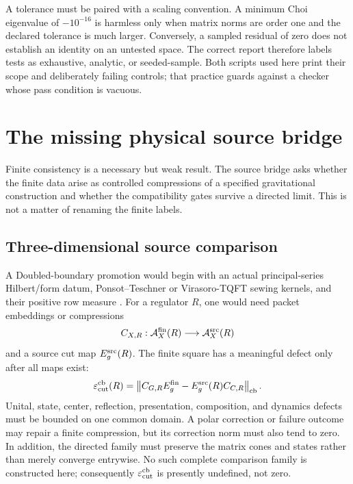 \documentclass[11pt,a4paper]{article}
\theoremstyle{definition}
\theoremstyle{remark}
\newcommand{\A}{\mathcal A}
\newcommand{\norm}[1]{\left\lVert #1\right\rVert}
\begin{document}
A tolerance must be paired with a scaling convention.  A minimum Choi eigenvalue of
$-10^{-16}$ is harmless only when matrix norms are order one and the declared tolerance
is much larger.  Conversely, a sampled residual of zero does not establish an identity
on an untested space.  The correct report therefore labels tests as exhaustive,
analytic, or seeded-sample.  Both scripts used here print their scope and deliberately
failing controls; that practice guards against a checker whose pass condition is
vacuous.

\section{The missing physical source bridge}
\label{sec:bridge}

Finite consistency is a necessary but weak result.  The source bridge asks whether the
finite data arise as controlled compressions of a specified gravitational construction
and whether the compatibility gates survive a directed limit.  This is not a matter of
renaming the finite labels.

\subsection{Three-dimensional source comparison}

A Doubled-boundary promotion would begin with an actual principal-series Hilbert/form datum,
Ponsot--Teschner or Virasoro-TQFT sewing kernels, and their positive row measure
\cite{PonsotTeschner1999,CollierEberhardtZhang2023}.  For a regulator $R$, one would need
packet embeddings or compressions
\begin{equation}
 C_{X,R}:\A_X^{\rm fin}(R)\longrightarrow\A_X^{\rm src}(R)
\end{equation}
and a source cut map $E_g^{\rm src}(R)$.  The finite square has a meaningful defect only
after all maps exist:
\begin{equation}
 \varepsilon_{\rm cut}^{\rm cb}(R)
 =\norm{C_{G,R}E_g^{\rm fin}-E_g^{\rm src}(R)C_{C,R}}_{\rm cb}.
 \label{eq:cez-defect}
\end{equation}
Unital, state, center, reflection, presentation, composition, and dynamics defects must
be bounded on one common domain.  A polar correction or failure outcome may repair a
finite compression, but its correction norm must also tend to zero.  In addition, the
directed family must preserve the matrix cones and states rather than merely converge
entrywise.  No such complete comparison family is constructed here; consequently
$\varepsilon_{\rm cut}^{\rm cb}$ is presently undefined, not zero.
\end{document}
